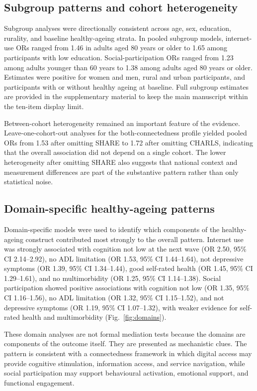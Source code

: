 \documentclass[pdflatex,sn-nature]{sn-jnl}
\begin{document}
\subsection{Subgroup patterns and cohort heterogeneity}

Subgroup analyses were directionally consistent across age, sex, education, rurality, and baseline healthy-ageing strata. In pooled subgroup models, internet-use ORs ranged from 1.46 in adults aged 80 years or older to 1.65 among participants with low education. Social-participation ORs ranged from 1.23 among adults younger than 60 years to 1.38 among adults aged 80 years or older. Estimates were positive for women and men, rural and urban participants, and participants with or without healthy ageing at baseline. Full subgroup estimates are provided in the supplementary material to keep the main manuscript within the ten-item display limit.

Between-cohort heterogeneity remained an important feature of the evidence. Leave-one-cohort-out analyses for the both-connectedness profile yielded pooled ORs from 1.53 after omitting SHARE to 1.72 after omitting CHARLS, indicating that the overall association did not depend on a single cohort. The lower heterogeneity after omitting SHARE also suggests that national context and measurement differences are part of the substantive pattern rather than only statistical noise.

\subsection{Domain-specific healthy-ageing patterns}

Domain-specific models were used to identify which components of the healthy-ageing construct contributed most strongly to the overall pattern. Internet use was strongly associated with cognition not low at the next wave (OR 2.50, 95\% CI 2.14--2.92), no ADL limitation (OR 1.53, 95\% CI 1.44--1.64), not depressive symptoms (OR 1.39, 95\% CI 1.34--1.44), good self-rated health (OR 1.45, 95\% CI 1.29--1.61), and no multimorbidity (OR 1.25, 95\% CI 1.14--1.38). Social participation showed positive associations with cognition not low (OR 1.35, 95\% CI 1.16--1.56), no ADL limitation (OR 1.32, 95\% CI 1.15--1.52), and not depressive symptoms (OR 1.19, 95\% CI 1.07--1.32), with weaker evidence for self-rated health and multimorbidity (Fig.~\ref{fig:domains}).

These domain analyses are not formal mediation tests because the domains are components of the outcome itself. They are presented as mechanistic clues. The pattern is consistent with a connectedness framework in which digital access may provide cognitive stimulation, information access, and service navigation, while social participation may support behavioural activation, emotional support, and functional engagement.
\end{document}
